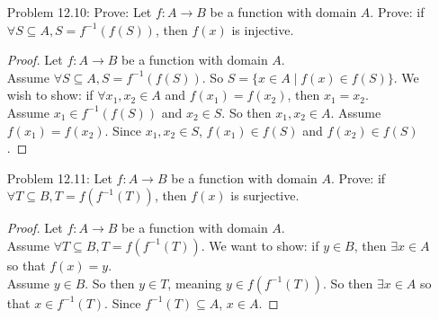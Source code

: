 \documentclass{article}
\theoremstyle{claim}
\theoremstyle{definition}
\begin{document}
\begin{enumerate}
    \item[Problem 12.10:] Prove: Let $f : A \rightarrow B$ be a function with domain $A$. Prove: if $\forall S \subseteq A, S = f^{-1}(f(S))$, then $f(x)$ is injective.
        \begin{proof}
            Let $f: A \rightarrow B$ be a function with domain $A$.\\
            Assume $\forall S \subseteq A, S = f^{-1}(f(S))$. So $S = \{ x \in A \mid f(x) \in f(S)\}$. We wish to show: if $\forall x_1, x_2 \in A$ and $f(x_1) = f(x_2)$, then $x_1 = x_2$.\\
            Assume $x_1 \in f^{-1}(f(S))$ and $ x_2 \in S$. So then $x_1, x_2 \in A$. Assume $f(x_1) = f(x_2)$. Since $x_1, x_2 \in S$, $f(x_1) \in f(S)$ and $f(x_2) \in f(S)$.
        \end{proof}
    \item[Problem 12.11:] Let $f: A \rightarrow B$ be a function with domain $A$. Prove: if $\forall T \subseteq B, T = f(f^{-1}(T))$, then $f(x)$ is surjective.
        \begin{proof}
            Let $f : A \rightarrow B$ be a function with domain $A$.\\
            Assume $\forall T \subseteq B, T = f(f^{-1}(T))$. We want to show: if $y \in B$, then $\exists x \in A$ so that $f(x) = y$.\\
            Assume $y \in B$. So then $y \in T$, meaning $y \in f(f^{-1}(T))$. So then $\exists x \in A$ so that $x \in f^{-1}(T)$. Since $f^{-1}(T) \subseteq A$, $x \in A$. 
        \end{proof}
\end{enumerate}
\end{document}
